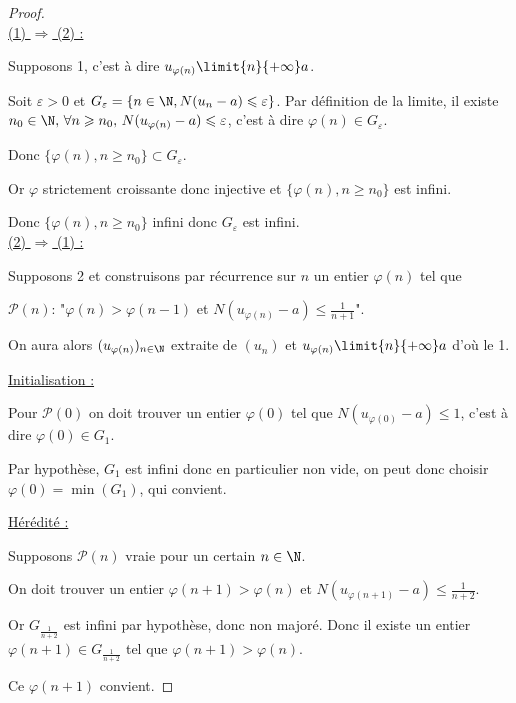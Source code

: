 

\begin{proof}~\\
    \uline{(1) $\Rightarrow$ (2) :}

    Supposons 1, c'est à dire $u_{\varphi(n)} \limit{n}{+\infty} a$.

    Soit $\varepsilon > 0$ et $G_\varepsilon = \{n \in \N, N(u_n - a) \leqslant \varepsilon\}$.
    Par définition de la limite, il existe $n_0 \in \N, \, \forall n \geqslant n_0, \, N(u_{\varphi(n)} - a) \leqslant \varepsilon$, 
    c'est à dire $\varphi(n) \in G_\varepsilon$.

    Donc $\{\varphi(n), n \geqslant n_0\} \subset G_\varepsilon$.

    Or $\varphi$ strictement croissante donc injective et $\{\varphi(n), n \geqslant n_0\}$ est infini.
    
    Donc $\{\varphi(n), n \geqslant n_0\}$ infini donc $G_\varepsilon$ est infini.\\
    
    \uline{(2) $\Rightarrow$ (1) :}

    Supposons 2 et construisons par récurrence sur $n$ un entier $\varphi(n)$ tel que

    $\mathscr P(n)$: "$\varphi(n) > \varphi(n - 1)$ et $N(u_{\varphi(n)} - a) \leqslant \frac 1 {n + 1}$".

    On aura alors $(u_{\varphi(n)})_{n \in \N}$ extraite de $(u_n)$ et $u_{\varphi(n)} \limit{n}{+\infty} a$
    d'où le 1. 

    \quad \uline{Initialisation :}

    \svspace Pour $\mathscr P(0)$ on doit trouver un entier $\varphi(0)$ tel que
    $N(u_{\varphi(0)} - a) \leqslant 1$, c'est à dire $\varphi(0) \in G_1$.

    Par hypothèse, $G_1$ est infini donc en particulier non vide, on peut donc 
    choisir $\varphi(0)  = \min(G_1)$, qui convient. 

    \quad \uline{Hérédité :}

    \svspace Supposons $\mathscr P(n)$ vraie pour un certain $n \in \N$.

    On doit trouver un entier $\varphi(n+1) > \varphi(n)$ et 
    $N(u_{\varphi(n + 1)} - a) \leqslant \frac 1 {n + 2}$. 

    Or $G_{\frac 1 {n + 2}}$ est infini par hypothèse, donc non majoré. Donc il existe
    un entier $\varphi(n + 1) \in G_{\frac 1 {n + 2}}$ tel que $\varphi(n + 1) > \varphi(n)$.

    Ce $\varphi(n + 1)$ convient.
\end{proof}

